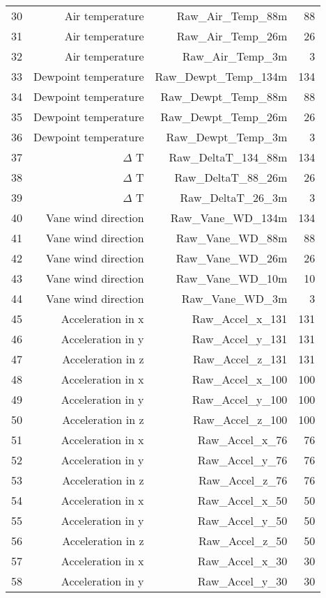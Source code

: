 \begin{longtable}{lrrr}
30 & Air temperature & Raw\_Air\_Temp\_88m & 88\\
31 & Air temperature & Raw\_Air\_Temp\_26m & 26\\
32 & Air temperature & Raw\_Air\_Temp\_3m & 3\\
33 & Dewpoint temperature & Raw\_Dewpt\_Temp\_134m & 134\\
34 & Dewpoint temperature & Raw\_Dewpt\_Temp\_88m & 88\\
35 & Dewpoint temperature & Raw\_Dewpt\_Temp\_26m & 26\\
36 & Dewpoint temperature & Raw\_Dewpt\_Temp\_3m & 3\\
37 & $\Delta$ T & Raw\_DeltaT\_134\_88m & 134\\
38 & $\Delta$ T & Raw\_DeltaT\_88\_26m & 26\\
39 & $\Delta$ T & Raw\_DeltaT\_26\_3m & 3\\
40 & Vane wind direction & Raw\_Vane\_WD\_134m & 134\\
41 & Vane wind direction & Raw\_Vane\_WD\_88m & 88\\
42 & Vane wind direction & Raw\_Vane\_WD\_26m & 26\\
43 & Vane wind direction & Raw\_Vane\_WD\_10m & 10\\
44 & Vane wind direction & Raw\_Vane\_WD\_3m & 3\\
45 & Acceleration in x & Raw\_Accel\_x\_131 & 131\\
46 & Acceleration in y & Raw\_Accel\_y\_131 & 131\\
47 & Acceleration in z & Raw\_Accel\_z\_131 & 131\\
48 & Acceleration in x & Raw\_Accel\_x\_100 & 100\\
49 & Acceleration in y & Raw\_Accel\_y\_100 & 100\\
50 & Acceleration in z & Raw\_Accel\_z\_100 & 100\\
51 & Acceleration in x & Raw\_Accel\_x\_76 & 76\\
52 & Acceleration in y & Raw\_Accel\_y\_76 & 76\\
53 & Acceleration in z & Raw\_Accel\_z\_76 & 76\\
54 & Acceleration in x & Raw\_Accel\_x\_50 & 50\\
55 & Acceleration in y & Raw\_Accel\_y\_50 & 50\\
56 & Acceleration in z & Raw\_Accel\_z\_50 & 50\\
57 & Acceleration in x & Raw\_Accel\_x\_30 & 30\\
58 & Acceleration in y & Raw\_Accel\_y\_30 & 30\\

\end{longtable}
